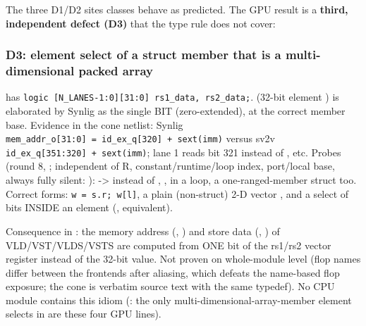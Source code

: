 \begin{record}
{}

The three D1/D2 sites classes behave as predicted. The GPU result is a
\textbf{third, independent defect (D3)} that the type rule does not
cover:

\end{record}

\subsubsection{D3: element select of a struct member that is a
multi-dimensional packed array}\label{cr:defect:synlig-struct-select-ainf:d3-element-select-of-a-struct-member-that-is-a-multi-dimensional-packed-array}

\begin{record}

 has
\texttt{logic\ [N\_\allowbreak{}LANES-\allowbreak{}1:\allowbreak{}0][31:\allowbreak{}0]\ rs1\_\allowbreak{}data,\allowbreak{}\ rs2\_\allowbreak{}data;}.
 (32-bit element ) is elaborated by
Synlig as the single BIT  (zero-extended), at the
correct member base. Evidence in the cone netlist: Synlig
\texttt{mem\_\allowbreak{}addr\_\allowbreak{}o[31:\allowbreak{}0]\ =\allowbreak{}\ id\_\allowbreak{}ex\_\allowbreak{}q[320]\ +\allowbreak{}\ sext(imm)}
versus sv2v
\texttt{id\_\allowbreak{}ex\_\allowbreak{}q[351:\allowbreak{}320]\ +\allowbreak{}\ sext(imm)};
lane 1 reads bit 321 instead of \code{[383:352]}, etc. Probes (round 8,
; independent of R,
constant/\allowbreak{}runtime/\allowbreak{}loop index,
port/\allowbreak{}local base, always fully silent: ):
 -\textgreater{}  instead of ,
,  in a loop, a one-ranged-member struct too.
Correct forms: \texttt{w\ =\allowbreak{}\ s.\allowbreak{}r;\ w[l]}, a
plain (non-struct) 2-D vector , and a select of bits INSIDE
an element (, equivalent).

Consequence in : the memory address
(, ) and store data
(, ) of
VLD/\allowbreak{}VST/\allowbreak{}VLDS/\allowbreak{}VSTS are computed
from ONE bit of the rs1/rs2 vector register instead of the 32-bit value.
Not proven on whole-module level (flop names differ between the
frontends after aliasing, which defeats the name-based flop exposure;
the cone is verbatim source text with the same typedef). No CPU module
contains this idiom (: the only
multi-dimensional-array-member element selects in  are these
four GPU lines).

\end{record}

